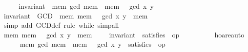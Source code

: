\begin{isabellebody}
%
\isadelimproof
%
\endisadelimproof
%
\isatagproof
{}\isamarkupfalse%
\ {}\isanewline
\ \ \isamarkupfalse%
\ {}invariant\ {}\ {}{}mem{}\ gcd\ {}mem\ {}{}\ {}mem\ {}{}\ {}\ gcd\ x\ y{}{}\isanewline
\isanewline
\ \ \isamarkupfalse%
\ {}{}invariant\ {}\ GCD\ {}\ {}mem{}\ mem\ {}\ {}\ gcd\ x\ y\ {}\ mem\ {}\ {}\ {}{}{}\isanewline
\ \ \isamarkupfalse%
\ {}simp\ add{}\ GCD{}def{}\ rule\ while{}\ simp{}all{}\isanewline
\ \ \ \ \isamarkupfalse%
\ {}{}mem{}\ mem\ {}\ {}\ gcd\ x\ y\ {}\ mem\ {}\ {}\ {}{}\ {}\ {}invariant\ {}\ satisfies\ {}\ {}op\ {}\ {}{}{}\isanewline
\ \ \ \ \ \ \isamarkupfalse%
\ hoare{}auto\isanewline
\isanewline
\ \ \ \ \isamarkupfalse%
\ {}{}mem{}\ gcd\ {}mem\ {}{}\ {}mem\ {}{}\ {}\ gcd\ x\ y{}\ {}\ satisfies\ {}\ {}op\ {}\ {}{}\isanewline

\end{isabellebody}
